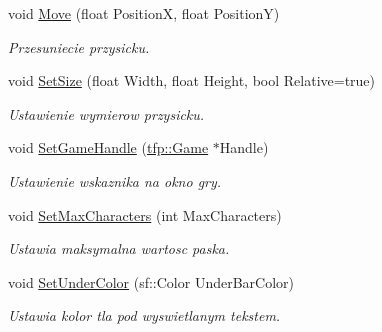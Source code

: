\begin{DoxyCompactItemize}
void \mbox{\hyperlink{classtfp_1_1_input_bar_af1da05af9e1a0275794db4e3da118117}{Move}} (float PositionX, float PositionY)
\begin{DoxyCompactList}\small\item\em Przesuniecie przysicku. \end{DoxyCompactList}\item 
\mbox{\label{classtfp_1_1_input_bar_ab145fdba4cc3eddadec1ee28db622cb7}} 
void \mbox{\hyperlink{classtfp_1_1_input_bar_ab145fdba4cc3eddadec1ee28db622cb7}{Set\+Size}} (float Width, float Height, bool Relative=true)
\begin{DoxyCompactList}\small\item\em Ustawienie wymierow przysicku. \end{DoxyCompactList}\item 
\mbox{\label{classtfp_1_1_input_bar_af0390d291c4d4e46bb6caae4dad312ea}} 
void \mbox{\hyperlink{classtfp_1_1_input_bar_af0390d291c4d4e46bb6caae4dad312ea}{Set\+Game\+Handle}} (\mbox{\hyperlink{classtfp_1_1_game}{tfp\+::\+Game}} $\ast$Handle)
\begin{DoxyCompactList}\small\item\em Ustawienie wskaznika na okno gry. \end{DoxyCompactList}\item 
\mbox{\label{classtfp_1_1_input_bar_a588e792e735bc631e29c2375aeb1f5ba}} 
void \mbox{\hyperlink{classtfp_1_1_input_bar_a588e792e735bc631e29c2375aeb1f5ba}{Set\+Max\+Characters}} (int Max\+Characters)
\begin{DoxyCompactList}\small\item\em Ustawia maksymalna wartosc paska. \end{DoxyCompactList}\item 
\mbox{\label{classtfp_1_1_input_bar_a13d52f71ee035310511988a2b4ae6892}} 
void \mbox{\hyperlink{classtfp_1_1_input_bar_a13d52f71ee035310511988a2b4ae6892}{Set\+Under\+Color}} (sf\+::\+Color Under\+Bar\+Color)
\begin{DoxyCompactList}\small\item\em Ustawia kolor tla pod wyswietlanym tekstem. \end{DoxyCompactList}\item 
\mbox{\label{classtfp_1_1_input_bar_a167e0c704af4ee7e60a3b9ff83d93838}} 

\end{DoxyCompactItemize}
